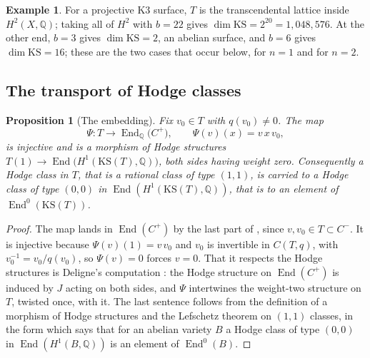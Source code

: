 \documentclass[11pt,reqno]{amsart}
\theoremstyle{plain}
\newtheorem{proposition}[theorem]{Proposition}
\theoremstyle{definition}
\newtheorem{example}[theorem]{Example}
\theoremstyle{remark}
\newcommand{\QQ}{\mathbb{Q}}
\DeclareMathOperator{\End}{End}
\begin{document}
\begin{example}\label{ex:ksdims}
For a projective K3 surface, $T$ is the transcendental lattice inside
$H^{2}(X,\QQ)$; taking all of $H^{2}$ with $b=22$ gives
$\dim\mathrm{KS}=2^{20}=1{,}048{,}576$. At the other end, $b=3$ gives
$\dim\mathrm{KS}=2$, an abelian surface, and $b=6$ gives
$\dim\mathrm{KS}=16$; these are the two cases that occur below, for $n=1$ and
for $n=2$.
\end{example}

\subsection{The transport of Hodge classes}

\begin{proposition}[The embedding]\label{prop:ksembed}
Fix $v_{0}\in T$ with $q(v_{0})\ne0$. The map
\[
  \Psi\colon T\longrightarrow\End_{\QQ}\bigl(C^{+}\bigr),
  \qquad
  \Psi(v)(x)=v\,x\,v_{0},
\]
is injective and is a morphism of Hodge structures
$T(1)\to\End\bigl(H^{1}(\mathrm{KS}(T),\QQ)\bigr)$, both sides having weight
zero. Consequently a Hodge class in $T$, that is a rational class of type
$(1,1)$, is carried to a Hodge class of type $(0,0)$ in
$\End(H^{1}(\mathrm{KS}(T),\QQ))$, that is to an element of
$\End^{0}(\mathrm{KS}(T))$.
\end{proposition}

\begin{proof}
The map lands in $\End(C^{+})$ by the last part of , since
$v,v_{0}\in T\subset C^{-}$. It is injective because $\Psi(v)(1)=v\,v_{0}$
and $v_{0}$ is invertible in $C(T,q)$, with $v_{0}^{-1}=v_{0}/q(v_{0})$, so
$\Psi(v)=0$ forces $v=0$. That it respects the Hodge structures is
Deligne's computation \cite[\S4]{Del72}: the Hodge structure on
$\End(C^{+})$ is induced by $J$ acting on both sides, and $\Psi$ intertwines
the weight-two structure on $T$, twisted once, with it. The last sentence
follows from the definition of a morphism of Hodge structures and the
Lefschetz theorem on $(1,1)$ classes, in the form which says that for an
abelian variety $B$ a Hodge class of type $(0,0)$ in $\End(H^{1}(B,\QQ))$ is
an element of $\End^{0}(B)$.
\end{proof}
\end{document}
